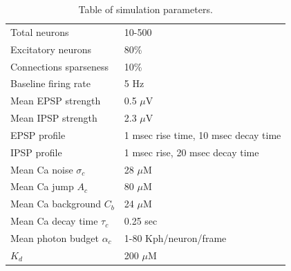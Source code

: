 \begin{table}[h!b!p!]
\caption{Table of simulation parameters.}\label{table:caparm}
\begin{tabular}{ll}
\hline
Total neurons & 10-500 \\
Excitatory neurons & 80\% \\
Connections sparseness & 10\% \\
Baseline firing rate & 5  Hz\\
Mean EPSP strength & 0.5 $\mu$V \\
Mean IPSP strength & 2.3 $\mu$V\\
EPSP profile & 1 msec rise time, 10 msec decay time \\
IPSP profile & 1 msec rise, 20 msec decay time \\
\hline
Mean Ca noise $\sigma_c$ & 28 $\mu$M \\
Mean Ca jump $A_c$ & 80 $\mu$M \\
Mean Ca background $C_b$ & 24 $\mu$M \\
Mean Ca decay time $\tau_c$ & 0.25 sec \\
Mean photon budget $\alpha_c$ & 1-80 Kph/neuron/frame \\
$K_d$ & 200 $\mu$M \\
\hline
\end{tabular}
\end{table}

